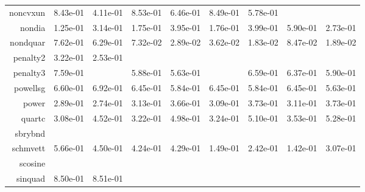 \begin{tabular}{rrrrrrrrr}
  noncvxun &  8.43e-01 &  4.11e-01 &  8.53e-01 &  6.46e-01 &  8.49e-01 &  5.78e-01 & \cellcolor{black}{\color{white}{ 6.46e-01}} & \cellcolor{black}{\color{white}{ 5.12e-01}} \\
  nondia &  1.25e-01 &  3.14e-01 &  1.75e-01 &  3.95e-01 &  1.76e-01 &  3.99e-01 &  5.90e-01 &  2.73e-01 \\
  nondquar &  7.62e-01 &  6.29e-01 &  7.32e-02 &  2.89e-02 &  3.62e-02 &  1.83e-02 &  8.47e-02 &  1.89e-02 \\
  penalty2 &  3.22e-01 &  2.53e-01 & \cellcolor{black}{\color{white}{      NaN}} & \cellcolor{black}{\color{white}{      NaN}} & \cellcolor{black}{\color{white}{      NaN}} & \cellcolor{black}{\color{white}{      NaN}} & \cellcolor{black}{\color{white}{      NaN}} & \cellcolor{black}{\color{white}{      NaN}} \\
  penalty3 &  7.59e-01 & \cellcolor{black}{\color{white}{ 8.60e-01}} &  5.88e-01 &  5.63e-01 & \cellcolor{black}{\color{white}{ 8.78e-01}} &  6.59e-01 &  6.37e-01 &  5.90e-01 \\
  powellsg &  6.60e-01 &  6.92e-01 &  6.45e-01 &  5.84e-01 &  6.45e-01 &  5.84e-01 &  6.45e-01 &  5.63e-01 \\
  power &  2.89e-01 &  2.74e-01 &  3.13e-01 &  3.66e-01 &  3.09e-01 &  3.73e-01 &  3.11e-01 &  3.73e-01 \\
  quartc &  3.08e-01 &  4.52e-01 &  3.22e-01 &  4.98e-01 &  3.24e-01 &  5.10e-01 &  3.53e-01 &  5.28e-01 \\
  sbrybnd & \cellcolor{black}{\color{white}{ 8.99e-01}} & \cellcolor{black}{\color{white}{ 8.63e-01}} & \cellcolor{black}{\color{white}{ 8.94e-01}} & \cellcolor{black}{\color{white}{ 8.95e-01}} & \cellcolor{black}{\color{white}{ 8.96e-01}} & \cellcolor{black}{\color{white}{ 8.98e-01}} & \cellcolor{black}{\color{white}{ 9.00e-01}} & \cellcolor{black}{\color{white}{ 9.00e-01}} \\
  schmvett &  5.66e-01 &  4.50e-01 &  4.24e-01 &  4.29e-01 &  1.49e-01 &  2.42e-01 &  1.42e-01 &  3.07e-01 \\
  scosine & \cellcolor{black}{\color{white}{ 8.98e-01}} & \cellcolor{black}{\color{white}{ 8.60e-01}} & \cellcolor{black}{\color{white}{ 8.92e-01}} & \cellcolor{black}{\color{white}{ 8.57e-01}} & \cellcolor{black}{\color{white}{ 8.98e-01}} & \cellcolor{black}{\color{white}{ 8.66e-01}} & \cellcolor{black}{\color{white}{ 8.99e-01}} & \cellcolor{black}{\color{white}{ 8.69e-01}} \\
  sinquad &  8.50e-01 &  8.51e-01 & \cellcolor{black}{\color{white}{ 8.67e-01}} & \cellcolor{black}{\color{white}{ 8.85e-01}} & \cellcolor{black}{\color{white}{ 8.84e-01}} & \cellcolor{black}{\color{white}{ 8.90e-01}} & \cellcolor{black}{\color{white}{ 8.94e-01}} & \cellcolor{black}{\color{white}{ 8.89e-01}} \\

\end{tabular}
